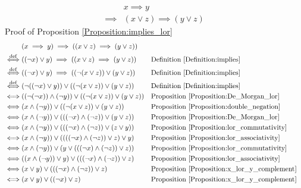 \begin{prop}
\label{Proposition:implies_lor}
\begin{align*}
& x \implies y \\
\implies & (x \lor z) \implies (y \lor z)
\end{align*}
Proof of Proposition \ref{Proposition:implies_lor}
\begin{align*}
& (x \implies y) \implies ((x \lor z) \implies (y \lor z)) \\
\overset{\operatorname{def}}{\iff} & ((\lnot x) \lor y) \implies ((x \lor z) \implies (y \lor z))
&& \text{Definition \ref{Definition:implies}} \\
\overset{\operatorname{def}}{\iff} & ((\lnot x) \lor y) \implies ((\lnot (x \lor z)) \lor (y \lor z))
&& \text{Definition \ref{Definition:implies}} \\
\overset{\operatorname{def}}{\iff} & (\lnot ((\lnot x) \lor y)) \lor ((\lnot (x \lor z)) \lor (y \lor z))
&& \text{Definition \ref{Definition:implies}} \\
\iff & ((\lnot (\lnot x)) \land (\lnot y)) \lor ((\lnot (x \lor z)) \lor (y \lor z))
&& \text{Proposition \ref{Proposition:De_Morgan_lor}} \\
\iff & (x \land (\lnot y)) \lor ((\lnot (x \lor z)) \lor (y \lor z))
&& \text{Proposition \ref{Proposition:double_negation}} \\
\iff & (x \land (\lnot y)) \lor (((\lnot x) \land (\lnot z)) \lor (y \lor z))
&& \text{Proposition \ref{Proposition:De_Morgan_lor}} \\
\iff & (x \land (\lnot y)) \lor (((\lnot x) \land (\lnot z)) \lor (z \lor y))
&& \text{Proposition \ref{Proposition:lor_commutativity}} \\
\iff & (x \land (\lnot y)) \lor ((((\lnot x) \land (\lnot z)) \lor z) \lor y)
&& \text{Proposition \ref{Proposition:lor_associativity}} \\
\iff & (x \land (\lnot y)) \lor (y \lor (((\lnot x) \land (\lnot z)) \lor z))
&& \text{Proposition \ref{Proposition:lor_commutativity}} \\
\iff & ((x \land (\lnot y)) \lor y) \lor (((\lnot x) \land (\lnot z)) \lor z)
&& \text{Proposition \ref{Proposition:lor_associativity}} \\
\iff & (x \lor y) \lor (((\lnot x) \land (\lnot z)) \lor z)
&& \text{Proposition \ref{Proposition:x_lor_y_complement}} \\
\iff & (x \lor y) \lor ((\lnot x) \lor z)
&& \text{Proposition \ref{Proposition:x_lor_y_complement}} \\

\end{align*}
\end{prop}
